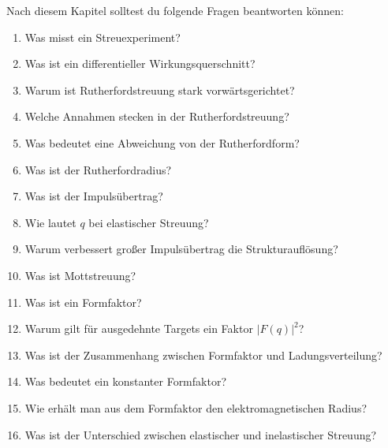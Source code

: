 \begin{examtipbox}
Nach diesem Kapitel solltest du folgende Fragen beantworten können:
\begin{enumerate}
    \item Was misst ein Streuexperiment?
    \item Was ist ein differentieller Wirkungsquerschnitt?
    \item Warum ist Rutherfordstreuung stark vorwärtsgerichtet?
    \item Welche Annahmen stecken in der Rutherfordstreuung?
    \item Was bedeutet eine Abweichung von der Rutherfordform?
    \item Was ist der Rutherfordradius?
    \item Was ist der Impulsübertrag?
    \item Wie lautet $q$ bei elastischer Streuung?
    \item Warum verbessert großer Impulsübertrag die Strukturauflösung?
    \item Was ist Mottstreuung?
    \item Was ist ein Formfaktor?
    \item Warum gilt für ausgedehnte Targets ein Faktor $|F(q)|^2$?
    \item Was ist der Zusammenhang zwischen Formfaktor und Ladungsverteilung?
    \item Was bedeutet ein konstanter Formfaktor?
    \item Wie erhält man aus dem Formfaktor den elektromagnetischen Radius?
    \item Was ist der Unterschied zwischen elastischer und inelastischer Streuung?
\end{enumerate}
\end{examtipbox}